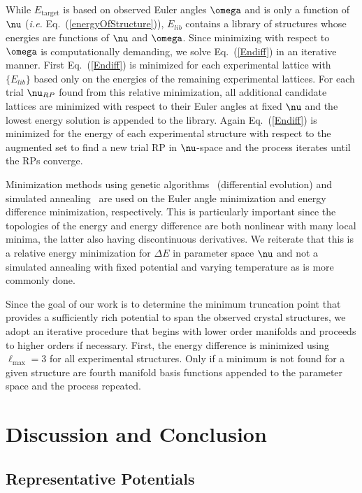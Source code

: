 \documentclass[preprint]{iucr}              %
\newcommand{\mb}[1]{\ensuremath{\mbox{\boldmath $ #1 $}}}
\begin{document}
While $E_{\mathrm{target}}$ is based on observed Euler angles
$\mb{\omega}$ and is only a function of $\mb{\nu}$ (\emph{i.e.} Eq.\
(\ref{energyOfStructure})), $E_{lib}$ contains a library of structures
whose energies are functions of $\mb{\nu}$ and $\mb{\omega}$. Since
minimizing with respect to $\mb{\omega}$ is computationally
demanding, we solve Eq.~(\ref{Endiff}) in an iterative manner. First
Eq.~(\ref{Endiff}) is minimized for each experimental lattice with
$\{E_{lib}\}$ based only on the energies of the remaining
experimental lattices. For each trial $\mb{\nu}_{RP}$ found from
this relative minimization, all additional candidate lattices are
minimized with respect to their Euler angles at fixed $\mb{\nu}$ and
the lowest energy solution is appended to the library. Again
Eq.~(\ref{Endiff}) is minimized for the energy of each experimental
structure with respect to the augmented set to find a new trial RP
in $\mb{\nu}$-space and the process iterates until the RPs
converge.

Minimization methods using genetic algorithms~\cite{Holland92} (differential
evolution) and simulated annealing~\cite{Kirkpatrick83} are used on
the Euler angle minimization and energy difference minimization,
respectively. This is particularly important since the topologies of
the energy and energy difference are both nonlinear with many local
minima, the latter also having discontinuous derivatives. We
reiterate that this is a relative energy minimization for $\Delta E$ in
parameter space $\mb{\nu}$ and not a simulated annealing with fixed
potential and varying temperature as is more commonly done.

Since the goal of our work is to determine the minimum truncation point that
provides a sufficiently rich potential to span the observed crystal structures,
we adopt an iterative procedure that begins with lower order manifolds and
proceeds to higher orders if necessary.  First, the energy difference is
minimized using $\ell_{\mathrm{max}}=3$ for all experimental
structures. Only if a minimum is not found for a given structure are
fourth manifold basis functions appended to the parameter space and
the process repeated.

\section{Discussion and Conclusion}
\label{discussion}

\subsection{Representative Potentials}
\label{representative_potentials}
\end{document}
